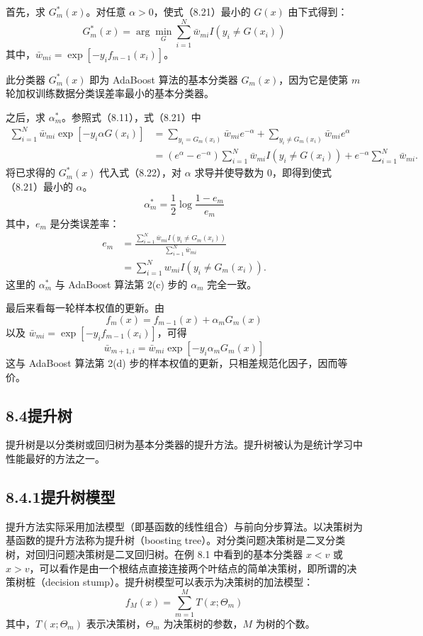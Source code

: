 \documentclass[UTF8,12pt,a4paper,fontset=fandol]{ctexart}
\begin{document}
首先，求 $G_m^\ast(x)$。对任意 $\alpha>0$，使式（8.21）最小的 $G(x)$ 由下式得到：
\[
G_m^\ast(x)=\arg\min_G\sum_{i=1}^N \bar{w}_{mi}I(y_i\ne G(x_i))
\]
其中，$\bar{w}_{mi}=\exp[-y_if_{m-1}(x_i)]$。

此分类器 $G_m^\ast(x)$ 即为 AdaBoost 算法的基本分类器 $G_m(x)$，因为它是使第 $m$ 轮加权训练数据分类误差率最小的基本分类器。

之后，求 $\alpha_m^\ast$。参照式（8.11），式（8.21）中
\begin{equation}
\begin{aligned}
\sum_{i=1}^N\bar{w}_{mi}\exp[-y_i\alpha G(x_i)]
&=\sum_{y_i=G_m(x_i)}\bar{w}_{mi}e^{-\alpha}
+\sum_{y_i\ne G_m(x_i)}\bar{w}_{mi}e^\alpha\\
&=(e^\alpha-e^{-\alpha})\sum_{i=1}^N\bar{w}_{mi}I(y_i\ne G(x_i))
+e^{-\alpha}\sum_{i=1}^N\bar{w}_{mi}.
\end{aligned}
\tag{8.22}
\end{equation}
将已求得的 $G_m^\ast(x)$ 代入式（8.22），对 $\alpha$ 求导并使导数为 0，即得到使式（8.21）最小的 $\alpha$。
\[
\alpha_m^\ast=\frac{1}{2}\log\frac{1-e_m}{e_m}
\]
其中，$e_m$ 是分类误差率：
\begin{equation}
\begin{aligned}
e_m&=\frac{\sum_{i=1}^N\bar{w}_{mi}I(y_i\ne G_m(x_i))}
{\sum_{i=1}^N\bar{w}_{mi}}\\
&=\sum_{i=1}^N w_{mi}I(y_i\ne G_m(x_i)).
\end{aligned}
\tag{8.23}
\end{equation}
这里的 $\alpha_m^\ast$ 与 AdaBoost 算法第 2(c) 步的 $\alpha_m$ 完全一致。

最后来看每一轮样本权值的更新。由
\[
f_m(x)=f_{m-1}(x)+\alpha_mG_m(x)
\]
以及 $\bar{w}_{mi}=\exp[-y_if_{m-1}(x_i)]$，可得
\[
\bar{w}_{m+1,i}=\bar{w}_{mi}\exp[-y_i\alpha_mG_m(x)]
\]
这与 AdaBoost 算法第 2(d) 步的样本权值的更新，只相差规范化因子，因而等价。

\subsection*{8.4\quad 提升树}

提升树是以分类树或回归树为基本分类器的提升方法。提升树被认为是统计学习中性能最好的方法之一。

\subsection*{8.4.1\quad 提升树模型}

提升方法实际采用加法模型（即基函数的线性组合）与前向分步算法。以决策树为基函数的提升方法称为提升树（boosting tree）。对分类问题决策树是二叉分类树，对回归问题决策树是二叉回归树。在例 8.1 中看到的基本分类器 $x<v$ 或 $x>v$，可以看作是由一个根结点直接连接两个叶结点的简单决策树，即所谓的决策树桩（decision stump）。提升树模型可以表示为决策树的加法模型：
\begin{equation}
f_M(x)=\sum_{m=1}^M T(x;\Theta_m)
\tag{8.24}
\end{equation}
其中，$T(x;\Theta_m)$ 表示决策树，$\Theta_m$ 为决策树的参数，$M$ 为树的个数。
\end{document}
